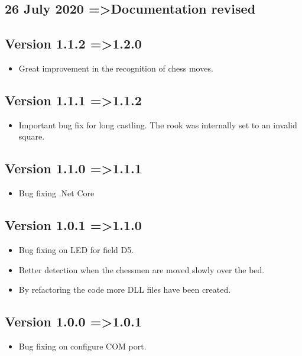 \documentclass[11pt,a4paper]{article}
\begin{document}
\subsection{26 July 2020 =\textgreater Documentation revised}
\subsection{Version 1.1.2 =\textgreater 1.2.0}
\begin{itemize}
	\item Great improvement in the recognition of chess moves.
\end{itemize}
\subsection{Version 1.1.1 =\textgreater 1.1.2}
\begin{itemize}
	\item Important bug fix for long castling. The rook was internally set to an invalid square.
\end{itemize}
\subsection{Version 1.1.0 =\textgreater 1.1.1}
\begin{itemize}
	\item Bug fixing .Net Core
\end{itemize}
\subsection{Version 1.0.1 =\textgreater 1.1.0}
\begin{itemize}
	\item Bug fixing on LED for field D5.
    \item Better detection when the chessmen are moved slowly over the bed.
    \item By refactoring the code more DLL files have been created.
\end{itemize}
\subsection{Version 1.0.0 =\textgreater 1.0.1}
\begin{itemize}
	\item Bug fixing on configure COM port.
\end{itemize}
\end{document}
